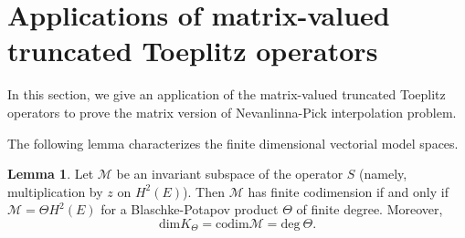 \documentclass{amsart}
\theoremstyle{definition}
\newtheorem{lem}[thm]{Lemma}
\newtheorem{ex}[thm]{Example}
\begin{document}





\section{\bf{Applications of matrix-valued} truncated Toeplitz operators}\label{s2}
In this section, we give an application of the matrix-valued truncated Toeplitz operators to prove the matrix version of Nevanlinna-Pick interpolation problem. 

The following lemma characterizes the finite dimensional vectorial model spaces.

 \begin{lem}\cite[Lemma 5.1]{Peller}
Let $\mathcal{M}$ be an invariant subspace of the operator $S$ (namely, multiplication by $z$ on $H^2(E)$). Then $\mathcal{M}$ has finite codimension if and only if $\mathcal{M}=\Theta H^2(E)$ for a Blaschke-Potapov product $\Theta$ of finite degree. Moreover,
$$\text{dim}K_{\Theta}=\text{codim}\mathcal{M}=\text{deg}~ \Theta.$$
 \end{lem}
\end{document}
